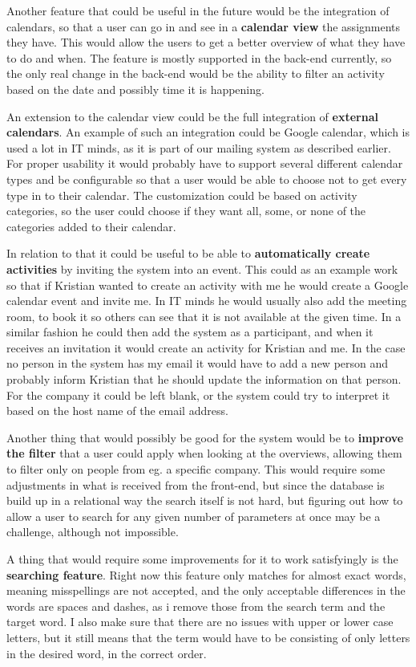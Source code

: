 Another feature that could be useful in the future would be the integration of
calendars, so that a user can go in and see in a \textbf{calendar view} the assignments
they have. This would allow the users to get a better overview of what they have
to do and when. The feature is mostly supported in the back-end currently, so
the only real change in the back-end would be the ability to filter an activity
based on the date and possibly time it is happening.

An extension to the calendar view could be the full integration of \textbf{external
calendars}. An example of such an integration could be Google calendar, which is
used a lot in IT minds, as it is part of our mailing system as described
earlier. For proper usability it would probably have to support several
different calendar types and be configurable so that a user would be able to
choose not to get every type in to their calendar. The customization could be
based on activity categories, so the user could choose if they want all, some,
or none of the categories added to their calendar.

In relation to that it could be useful to be able to \textbf{automatically create
activities} by inviting the system into an event. This could as an example work
so that if Kristian wanted to create an activity with me he would create a
Google calendar event and invite me. In IT minds he would usually also add the
meeting room, to book it so others can see that it is not available at the given
time. In a similar fashion he could then add the system as a participant, and
when it receives an invitation it would create an activity for Kristian and me.
In the case no person in the system has my email it would have to add a new
person and probably inform Kristian that he should update the information on
that person. For the company it could be left blank, or the system could try to
interpret it based on the host name of the email address.

Another thing that would possibly be good for the system would  be to \textbf{improve
the filter} that a user could apply when looking at the overviews, allowing them
to filter only on people from eg. a specific company. This would require some
adjustments in what is received from the front-end, but since the database is
build up in a relational way the search itself is not hard, but figuring out how
to allow a user to search for any given number of parameters at once may be a
challenge, although not impossible.

A thing that would require some improvements for it to work satisfyingly is the
\textbf{searching feature}. Right now this feature only matches for almost exact words,
meaning misspellings are not accepted, and the only acceptable differences in
the words are spaces and dashes, as i remove those from the search term and the
target word. I also make sure that there are no issues with upper or lower case
letters, but it still means that the term would have to be consisting of only
letters in the desired word, in the correct order.

